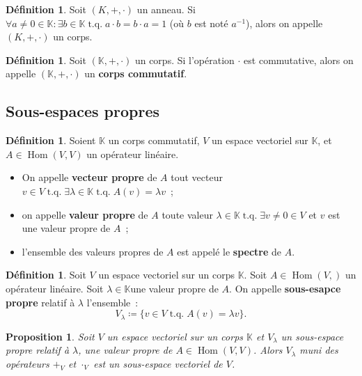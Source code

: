 \documentclass{article}
\DeclareMathOperator{\tq}{\text{ t.q. }}
\DeclareMathOperator{\Hom}{Hom}
\newcommand{\K}{\mathbb K}
\newtheorem{prp}[thm]{Proposition}
\theoremstyle{definition}
\newtheorem{déf}[thm]{Définition}
\theoremstyle{remark}
\begin{document}
		\begin{déf} Soit $(K, +, \cdot)$ un anneau. Si $\forall a \neq 0 \in \K : \exists b \in \K \tq a \cdot b = b \cdot a = 1$ (où $b$ est noté $a^{-1}$), alors
		on appelle $(K, +, \cdot)$ un corps. \end{déf}

		\begin{déf} Soit $(\K, +, \cdot)$ un corps. Si l'opération $\cdot$ est commutative, alors on appelle $(\K, +, \cdot)$ un \textbf{corps commutatif}. \end{déf}

	\subsection{Sous-espaces propres}
		\begin{déf} Soient $\K$ un corps commutatif, $V$ un espace vectoriel sur $\K$, et $A \in \Hom(V, V)$ un opérateur linéaire.

		\begin{itemize}
			\item On appelle \textbf{vecteur propre} de $A$ tout vecteur $v \in V \tq \exists \lambda \in \K \tq A(v) = \lambda v$~;
			\item on appelle \textbf{valeur propre } de $A$ toute valeur $\lambda \in \K \tq \exists v \neq 0 \in V$ et $v$ est une valeur propre de $A$~;
			\item l'ensemble des valeurs propres de $A$ est appelé le \textbf{spectre} de $A$.
		\end{itemize}
		\end{déf}

		\begin{déf} Soit $V$ un espace vectoriel sur un corps $\K$. Soit $A \in \Hom(V, )$ un opérateur linéaire. Soit $\lambda \in \K$une valeur propre de $A$.
		On appelle \textbf{sous-esapce propre} relatif à $\lambda$ l'ensemble~: \[V_\lambda \coloneqq \{v \in V \tq A(v) = \lambda v\}.\] \end{déf}

		\begin{prp} Soit $V$ un espace vectoriel sur un corps $\K$ et $V_\lambda$ un sous-espace propre relatif à $\lambda$, une valeur propre de $A \in \Hom(V, V)$.
		Alors $V_\lambda$ muni des opérateurs $+_V$ et $\cdot_V$ est un sous-espace vectoriel de $V$. \end{prp}
\end{document}
